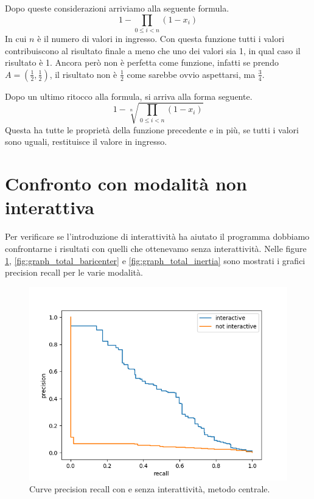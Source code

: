 Dopo queste considerazioni arriviamo alla seguente formula.
\begin{equation*}
    1 - \prod_{0\leq i < n} (1-x_i)
\end{equation*}
In cui $n$ \`e il numero di valori in ingresso. Con questa funzione tutti i valori contribuiscono al risultato finale a meno che uno dei valori sia 1, in qual caso il risultato \`e 1. Ancora per\`o non \`e perfetta come funzione, infatti se prendo $A = ( \frac{1}{2}, \frac{1}{2} )$, il risultato non \`e $\frac{1}{2}$ come sarebbe ovvio aspettarsi, ma $\frac{3}{4}$.

Dopo un ultimo ritocco alla formula, si arriva alla forma seguente.
\begin{equation*}
    1 - \sqrt[n]{\prod_{0\leq i < n} (1-x_i)}
\end{equation*}
Questa ha tutte le propriet\`a della funzione precedente e in pi\`u, se tutti i valori sono uguali, restituisce il valore in ingresso.

\section{Confronto con modalit\`a non interattiva}

Per verificare se l'introduzione di interattivit\`a ha aiutato il programma dobbiamo confrontarne i risultati con quelli che ottenevamo senza interattivit\`a. Nelle figure \ref{fig:graph_total_static}, \ref{fig:graph_total_baricenter} e \ref{fig:graph_total_inertia} sono mostrati i grafici precision recall per le varie modalit\`a.

\begin{figure}
    \centering
    \includegraphics[width=.9\textwidth]{figures/graphs/totalstaticFalse.png}
    \caption{Curve precision recall con e senza interattivit\`a, metodo centrale.}
    \label{fig:graph_total_static}
\end{figure}

